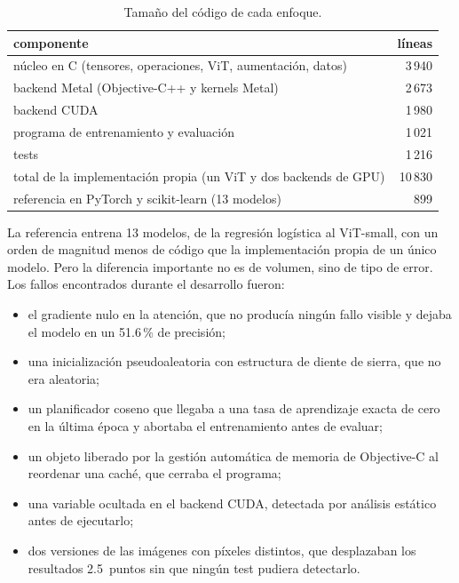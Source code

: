 \documentclass[11pt,a4paper]{article}
\begin{document}
\begin{table}[H]
  \centering\small
  \begin{tabular}{lr}
    \toprule
    componente & líneas \\
    \midrule
    núcleo en C (tensores, operaciones, ViT, aumentación, datos) & 3\,940 \\
    backend Metal (Objective-C++ y kernels Metal) & 2\,673 \\
    backend CUDA & 1\,980 \\
    programa de entrenamiento y evaluación & 1\,021 \\
    tests & 1\,216 \\
    \midrule
    total de la implementación propia (un ViT y dos backends de GPU) & 10\,830 \\
    referencia en PyTorch y scikit-learn (13 modelos) & 899 \\
    \bottomrule
  \end{tabular}
  \caption{Tamaño del código de cada enfoque.}
  \label{tab:esfuerzo}
\end{table}

La referencia entrena 13 modelos, de la regresión logística al ViT-small, con
un orden de magnitud menos de código que la implementación propia de un único
modelo. Pero la diferencia importante no es de volumen, sino de tipo de error. Los fallos encontrados durante el desarrollo fueron:

\begin{itemize}
  \item el gradiente nulo en la atención, que no producía ningún fallo visible y
        dejaba el modelo en un 51.6\,\% de precisión;
  \item una inicialización pseudoaleatoria con estructura de diente de
        sierra, que no era aleatoria;
  \item un planificador coseno que llegaba a una tasa de aprendizaje exacta de
        cero en la última época y abortaba el entrenamiento antes de evaluar;
  \item un objeto liberado por la gestión automática de memoria de
        Objective-C al reordenar una caché, que cerraba el programa;
  \item una variable ocultada en el backend CUDA, detectada por análisis
        estático antes de ejecutarlo;
  \item dos versiones de las imágenes con píxeles distintos, que desplazaban
        los resultados 2.5~puntos sin que ningún test pudiera detectarlo.
\end{itemize}
\end{document}
